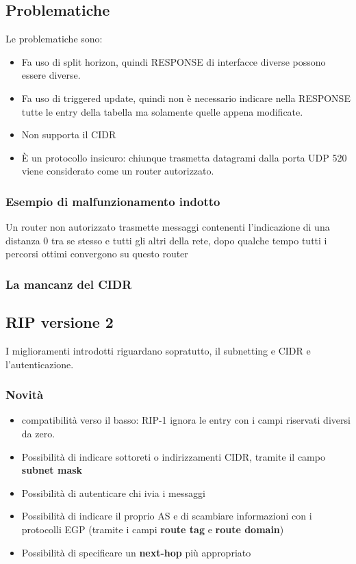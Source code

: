 \documentclass{report}
\begin{document}
            \subsection{Problematiche}
                Le problematiche sono:
                \begin{itemize}
                    \item Fa uso di split horizon, quindi RESPONSE di interfacce diverse possono essere diverse.
                    \item Fa uso di triggered update, quindi non è necessario indicare nella RESPONSE tutte le entry della tabella ma solamente quelle appena modificate.
                    \item Non supporta il CIDR
                    \item È un protocollo insicuro: chiunque trasmetta datagrami dalla porta UDP 520 viene considerato come un router autorizzato.
                \end{itemize} 
                \subsubsection{Esempio di malfunzionamento indotto}
                    Un router non autorizzato trasmette messaggi contenenti l'indicazione di una distanza 0 tra se stesso e tutti gli altri della rete, dopo qualche tempo tutti i percorsi ottimi convergono su questo router
                \subsubsection{La mancanz del CIDR}
            \subsection{RIP versione 2}
                I miglioramenti introdotti riguardano sopratutto, il subnetting e CIDR e l'autenticazione.
                \subsubsection{Novità}
                    \begin{itemize}
                        \item compatibilità verso il basso: RIP-1 ignora le entry con i campi riservati diversi da zero.
                        \item Possibilità di indicare sottoreti o indirizzamenti CIDR, tramite il campo \textbf{subnet mask}
                        \item Possibilità di autenticare chi ivia i messaggi
                        \item Possibilità di indicare il proprio AS e di scambiare informazioni con i protocolli EGP (tramite i campi \textbf{route tag} e \textbf{route domain})
                        \item Possibilità di specificare un \textbf{next-hop} più appropriato
                    \end{itemize}
\end{document}
